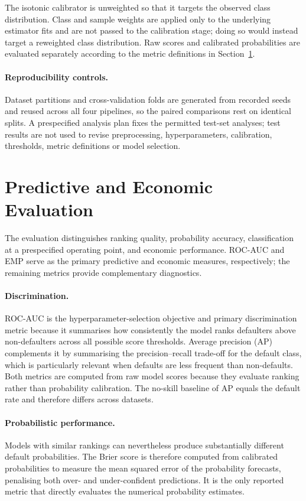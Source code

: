 The isotonic calibrator is unweighted so that it targets the observed class
distribution. Class and sample weights are applied only to the underlying
estimator fits and are not passed to the calibration stage; doing so would instead
target a reweighted class distribution. Raw scores and calibrated probabilities
are evaluated separately according to the metric definitions in
Section~\ref{sec:eval}.

\paragraph{Reproducibility controls.}
Dataset partitions and cross-validation folds are generated from recorded seeds and
reused across all four pipelines, so the paired comparisons rest on identical splits.
A prespecified analysis plan fixes the permitted test-set analyses; test results are not
used to revise preprocessing, hyperparameters, calibration, thresholds, metric
definitions or model selection.

\section{Predictive and Economic Evaluation}\label{sec:eval}

The evaluation distinguishes ranking quality, probability accuracy,
classification at a prespecified operating point, and economic performance.
ROC-AUC and EMP serve as the primary predictive and economic measures,
respectively; the remaining metrics provide complementary diagnostics.

\paragraph{Discrimination.}
ROC-AUC is the hyperparameter-selection objective and primary discrimination
metric because it summarises how consistently the model ranks defaulters above
non-defaulters across all possible score thresholds. Average precision (AP)
complements it by summarising the precision--recall trade-off for the default
class, which is particularly relevant when defaults are less frequent than
non-defaults. Both metrics are computed from raw model scores because they
evaluate ranking rather than probability calibration. The no-skill baseline of
AP equals the default rate and therefore differs across datasets.

\paragraph{Probabilistic performance.}
Models with similar rankings can nevertheless produce substantially different
default probabilities. The Brier score is therefore computed from calibrated
probabilities to measure the mean squared error of the probability forecasts,
penalising both over- and under-confident predictions. It is the only reported
metric that directly evaluates the numerical probability estimates.

